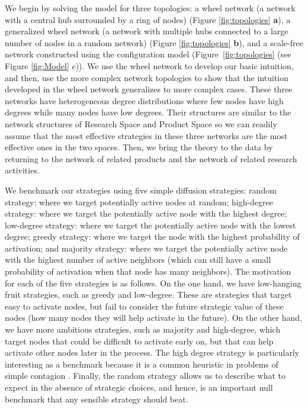 \documentclass[preprint,superscriptaddress,floatfix]{article}
\begin{document}
We begin by solving the model for three topologies: a wheel network (a network with a central hub surrounded by a ring of nodes) (Figure \ref{fig:topologies} \textbf{a}), a generalized wheel network (a network with multiple hubs connected to a large number of nodes in a random network) (Figure \ref{fig:topologies} \textbf{b}), and a scale-free network constructed using the configuration model\cite{newman2003structure} (Figure~\ref{fig:topologies} (see Figure \ref{fig:Model} c)). We use the wheel network to develop our basic intuition, and then, use the more complex network topologies to show that the intuition developed in the wheel network generalizes to more complex cases. These three networks have heterogeneous degree distributions where few nodes have high degrees while many nodes have low degrees. Their structures are similar to the network structures of Research Space and Product Space so we can readily assume that the most effective strategies in these three networks are the most effective ones in the two spaces. Then, we bring the theory to the data by returning to the network of related products and the network of related research activities.

We benchmark our strategies using five simple diffusion strategies: random strategy: where we target potentially active nodes at random; high-degree strategy: where we target the potentially active node with the highest degree; low-degree strategy: where we target the potentially active node with the lowest degree; greedy strategy: where we target the node with the highest probability of activation; and majority strategy: where we target the potentially active node with the highest number of active neighbors (which can still have a small probability of activation when that node has many neighbors). The motivation for each of the five strategies is as follows. On the one hand, we have low-hanging fruit strategies, such as greedy and low-degree. These are strategies that target easy to activate nodes, but fail to consider the future strategic value of these nodes (how many nodes they will help activate in the future). On the other hand, we have more ambitious strategies, such as majority and high-degree, which target nodes that could be difficult to activate early on, but that can help activate other nodes later in the process.
The high degree strategy is particularly interesting as a benchmark because it is a common heuristic in problems of simple contagion \cite{dezso2001can,pastor2001epidemic}. Finally, the random strategy allows us to describe what to expect in the absence of strategic choices, and hence, is an important null benchmark that any sensible strategy should beat.
\end{document}

